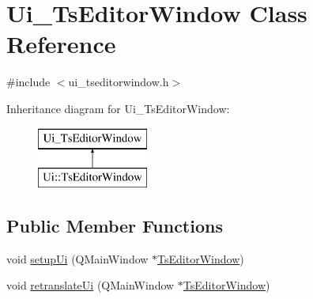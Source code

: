\hypertarget{class_ui___ts_editor_window}{}\section{Ui\+\_\+\+Ts\+Editor\+Window Class Reference}
\label{class_ui___ts_editor_window}


{\ttfamily \#include $<$ui\+\_\+tseditorwindow.\+h$>$}

Inheritance diagram for Ui\+\_\+\+Ts\+Editor\+Window\+:\begin{figure}[H]
\begin{center}
\leavevmode
\includegraphics[height=2.000000cm]{d4/d56/class_ui___ts_editor_window}
\end{center}
\end{figure}
\subsection*{Public Member Functions}
\begin{DoxyCompactItemize}
\item 
void \mbox{\hyperlink{class_ui___ts_editor_window_aebf6e9d4e849847c439ca5bdfd933cd7}{setup\+Ui}} (Q\+Main\+Window $\ast$\mbox{\hyperlink{class_ts_editor_window}{Ts\+Editor\+Window}})
\item 
void \mbox{\hyperlink{class_ui___ts_editor_window_a734a9f8b7a21d39655fa1e56719ce2a7}{retranslate\+Ui}} (Q\+Main\+Window $\ast$\mbox{\hyperlink{class_ts_editor_window}{Ts\+Editor\+Window}})
\end{DoxyCompactItemize}
